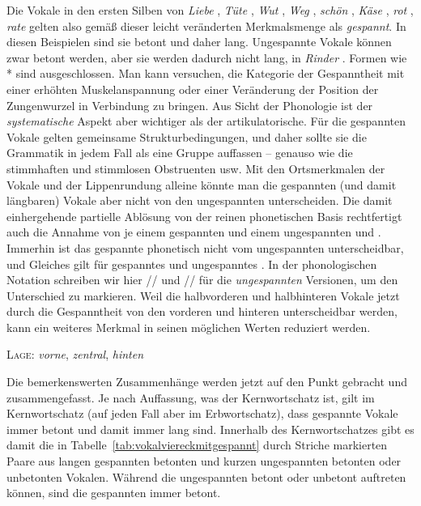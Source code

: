 Die Vokale in den ersten Silben von \textit{Liebe} \textipa{[li:b@]}, \textit{Tüte} \textipa{[ty:t@]}, \textit{Wut} \textipa{[vu:t]}, \textit{Weg} \textipa{[ve:k]}, \textit{schön} \textipa{[S\o:n]}, \textit{Käse} \textipa{[kE:z@]}, \textit{rot} \textipa{[ro:t]}, \textit{rate} \textipa{[Ka:t@]} gelten also gemäß dieser leicht veränderten Merkmalsmenge als \textit{gespannt}.
In diesen Beispielen sind sie betont und daher lang.
Ungespannte Vokale können zwar betont werden, aber sie werden dadurch nicht lang, \zB in \textit{Rinder} \textipa{[KInd5]}.
Formen wie *\textipa{[KI:nd5]} sind ausgeschlossen.
Man kann versuchen, die Kategorie der Gespanntheit mit einer erhöhten Muskelanspannung oder einer Veränderung der Position der Zungenwurzel in Verbindung zu bringen.
Aus Sicht der Phonologie ist der \textit{systematische} Aspekt aber wichtiger als der artikulatorische.
Für die gespannten Vokale gelten gemeinsame Strukturbedingungen, und daher sollte sie die Grammatik in jedem Fall als eine Gruppe auffassen -- genauso wie die stimmhaften und stimmlosen Obstruenten usw.
Mit den Ortsmerkmalen der Vokale und der Lippenrundung alleine könnte man die gespannten (und damit längbaren) Vokale aber nicht von den ungespannten unterscheiden.
Die damit einhergehende partielle Ablösung von der reinen phonetischen Basis rechtfertigt auch die Annahme von je einem gespannten und einem ungespannten \textipa{[a]} und \textipa{[E]}.
Immerhin ist das gespannte \textipa{[a]} phonetisch nicht vom ungespannten \textipa{[a]} unterscheidbar, und Gleiches gilt für gespanntes und ungespanntes \textipa{[E]}.
In der phonologischen Notation schreiben wir hier // und // für die \textit{ungespannten} Versionen, um den Unterschied zu markieren.
Weil die halbvorderen und halbhinteren Vokale jetzt durch die Gespanntheit von den vorderen und hinteren unterscheidbar werden, kann ein weiteres Merkmal in seinen möglichen Werten reduziert werden.

\begin{exe}
  \ex \textsc{Lage}: \textit{vorne}, \textit{zentral}, \textit{hinten}
\end{exe}

Die bemerkenswerten Zusammenhänge werden jetzt auf den Punkt gebracht und zusammengefasst.
Je nach Auffassung, was der Kernwortschatz ist, gilt im Kernwortschatz (auf jeden Fall aber im Erbwortschatz), dass gespannte Vokale immer betont und damit immer lang sind.
Innerhalb des Kernwortschatzes gibt es damit die in Tabelle~\ref{tab:vokalviereckmitgespannt} durch Striche markierten Paare aus langen gespannten betonten und kurzen ungespannten betonten oder unbetonten Vokalen.
Während die ungespannten betont oder unbetont auftreten können, sind die gespannten immer betont.

